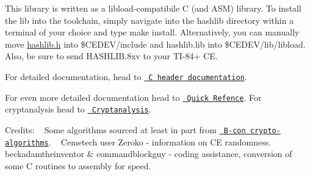 This library is written as a libload-\/compatibile C (and ASM) library. To install the lib into the toolchain, simply navigate into the hashlib directory within a terminal of your choice and type {\ttfamily make install}. Alternatively, you can manually move {\ttfamily \mbox{\hyperlink{hashlib_8h}{hashlib.\+h}}} into {\ttfamily \$\+CEDEV/include} and {\ttfamily hashlib.\+lib} into {\ttfamily \$\+CEDEV/lib/libload}. Also, be sure to send {\ttfamily HASHLIB.\+8xv} to your TI-\/84+ CE.

For detailed documentation, head to \href{https://acagliano.github.io/hashlib/html/}{\texttt{ C header documentation}}.

For even more detailed documentation head to \href{https://github.com/acagliano/hashlib/blob/stable/HASHLIB\%20Quick\%20Reference.pdf}{\texttt{ Quick Refence}}. For cryptanalysis head to \href{https://github.com/acagliano/hashlib/blob/stable/HASHLIB\%20Cryptanalysis.pdf}{\texttt{ Cryptanalysis}}.

Credits\+: ~\newline
 Some algorithms sourced at least in part from \href{https://github.com/B-Con/crypto-algorithms}{\texttt{ B-\/con crypto-\/algorithms}}. ~\newline
 Cemetech user Zeroko -\/ information on CE randomness. ~\newline
 beckadamtheinventor \& commandblockguy -\/ coding assistance, conversion of some C routines to assembly for speed. ~\newline
 